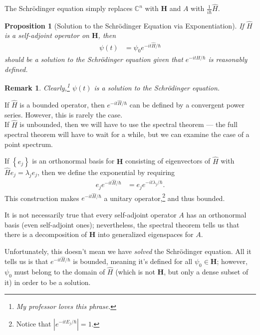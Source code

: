 \documentclass[10pt]{extarticle}
\newtheorem*{remark}{Remark}
\newcommand{\C}{\mathbb{C}}
\newcommand{\set}[1]{\left\{#1\right\}}
\theoremstyle{plain}
\newtheorem*{proposition}{Proposition}%
\theoremstyle{definition}
\theoremstyle{remark}
\renewcommand{\newline}{\hfill\break}
\begin{document}
  The Schrödinger equation simply replaces $\C^{n}$ with $\mathbf{H}$ and $A$ with $\frac{1}{i\hbar}\hat{H}$.
  \begin{proposition}[Solution to the Schrödinger Equation via Exponentiation]
    If $\hat{H}$ is a self-adjoint operator on $\mathbf{H}$, then
    \begin{align*}
      \psi(t) &= \psi_0 e^{-it\hat{H}/\hbar}
    \end{align*}
    should be a solution to the Schrödinger equation given that $e^{-it\hat{H}/\hbar}$ is reasonably defined.
  \end{proposition}
  \begin{remark}
    Clearly,\footnote{My professor loves this phrase.} $\psi(t)$ is a solution to the Schrödinger equation.
  \end{remark}
  If $\hat{H}$ is a bounded operator, then $e^{-it\hat{H}/\hbar}$ can be defined by a convergent power series. However, this is rarely the case.\\

  If $\hat{H}$ is unbounded, then we will have to use the spectral theorem --- the full spectral theorem will have to wait for a while, but we can examine the case of a point spectrum.\newline

  If $\set{e_j}$ is an orthonormal basis for $\mathbf{H}$ consisting of eigenvectors of $\hat{H}$ with $\hat{H}e_j = \lambda_je_j$, then we define the exponential by requiring
  \begin{align*}
    e_je^{-it\hat{H}/\hbar} &= e_je^{-it\lambda_j/\hbar}.
  \end{align*}
  This construction makes $e^{-it\hat{H}/\hbar}$ a unitary operator,\footnote{Notice that $\left|e^{-itE_j/\hbar}\right| = 1$.} and thus bounded.\newline

  It is not necessarily true that every self-adjoint operator $A$ has an orthonormal basis (even self-adjoint ones); nevertheless, the spectral theorem tells us that there is a decomposition of $\mathbf{H}$ into generalized eigenspaces for $A$.\newline

  Unfortunately, this doesn't mean we have \textit{solved} the Schrödinger equation. All it tells us is that $e^{-it\hat{H}/\hbar}$ is bounded, meaning it's defined for all $\psi_0 \in \mathbf{H}$; however, $\psi_0$ must belong to the domain of $\hat{H}$ (which is not $\mathbf{H}$, but only a dense subset of it) in order to be a solution.\newline
\end{document}
